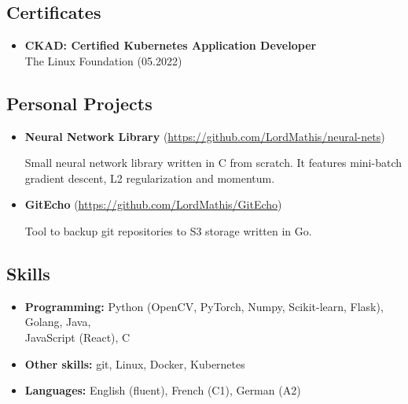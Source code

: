\documentclass[a4paper,12pt]{article}
\begin{document}
{\color{myblue}
\subsection*{Certificates}\label{certificates}
}
\begin{itemize}
    \item   
    \textbf{CKAD: Certified Kubernetes Application Developer}\\
     The Linux Foundation \hfill (05.2022)
\end{itemize}

{\color{myblue}
\subsection*{Personal Projects}\label{projects}
}
\begin{itemize}
\item
    \textbf{Neural Network Library} (\href{https://github.com/LordMathis/neural-nets}{https://github.com/LordMathis/neural-nets})

    Small neural network library written in C from scratch. It features mini-batch gradient descent, L2 regularization and momentum.

\item 
    \textbf{GitEcho} (\href{https://github.com/LordMathis/GitEcho}{https://github.com/LordMathis/GitEcho})

    Tool to backup git repositories to S3 storage written in Go.
\end{itemize}

{\color{myblue}
\subsection*{Skills}\label{skills}
}
\begin{itemize}
\setlength\itemsep{0.2em} %
\item
  \textbf{Programming:} Python (OpenCV, PyTorch, Numpy, Scikit-learn, Flask), Golang, Java, \\ JavaScript (React), C
\item
  \textbf{Other skills:} git, Linux, Docker, Kubernetes
\item
  \textbf{Languages:} English (fluent), French (C1), German (A2)
\end{itemize}
\end{document}

